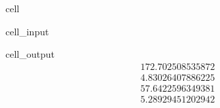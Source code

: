 \documentclass[letterpaper,10pt,english]{jupyterBook}
\begin{document}
\begin{sphinxuseclass}{cell}\begin{sphinxVerbatimInput}

\begin{sphinxuseclass}{cell_input}
\begin{sphinxVerbatim}[commandchars=\\\{\}]

\end{sphinxVerbatim}

\end{sphinxuseclass}\end{sphinxVerbatimInput}
\begin{sphinxVerbatimOutput}

\begin{sphinxuseclass}{cell_output}\begin{equation*}
\begin{split}172.702508535872\end{split}
\end{equation*}\begin{equation*}
\begin{split}4.83026407886225\end{split}
\end{equation*}\begin{equation*}
\begin{split}57.6422596349381\end{split}
\end{equation*}\begin{equation*}
\begin{split}5.28929451202942\end{split}
\end{equation*}
\end{sphinxuseclass}\end{sphinxVerbatimOutput}

\end{sphinxuseclass}
\end{document}
